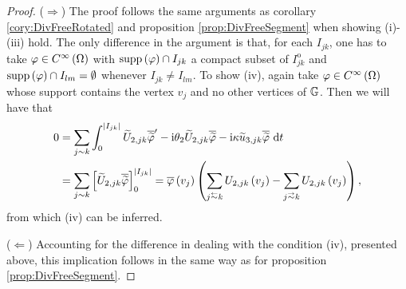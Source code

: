 \begin{proof}
	($\Rightarrow$) The proof follows the same arguments as corollary \ref{cory:DivFreeRotated} and proposition \ref{prop:DivFreeSegment} when showing (i)-(iii) hold.
	The only difference in the argument is that, for each $I_{jk}$, one has to take $\varphi\in C^{\infty}\left( \Omega \right)$ with $\mathrm{supp}\left( \varphi \right)\cap I_{jk}$ a compact subset of $I_{jk}^{\mathrm{o}}$ and $\mathrm{supp}\left( \varphi \right)\cap I_{lm} = \emptyset$ whenever $I_{jk}\neq I_{lm}$.
	To show (iv), again take $\varphi\in C^{\infty}\left( \Omega \right)$ whose support contains the vertex $v_j$ and no other vertices of $\mathbb{G}$.
	Then we will have that
	\begin{align*}
		0
		&= \sum_{j\con k}\int_0^{\abs{I_{jk}}} \widetilde{U}_{2,jk}\overline{\widetilde{\varphi}}' - \rmi\qm_2\widetilde{U}_{2,jk}\overline{\widetilde{\varphi}} - \rmi\wavenumber\widetilde{u}_{3,jk}\overline{\widetilde{\varphi}} \ \md t  \\
		&= \sum_{j\con k}\sqbracs{ \widetilde{U}_{2,jk}\overline{\widetilde{\varphi}} }_0^{\abs{I_{jk}}}
		= \overline{\varphi}\bracs{v_j}\bracs{ \sum_{j\conRight k} U_{2,jk}\bracs{v_j} - \sum_{j\conLeft k} U_{2,jk}\bracs{v_j} },
	\end{align*}
	from which (iv) can be inferred.
	
	($\Leftarrow$) Accounting for the difference in dealing with the condition (iv), presented above, this implication follows in the same way as for proposition \ref{prop:DivFreeSegment}.
\end{proof}